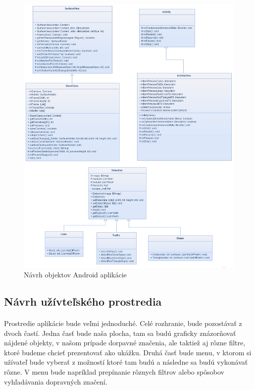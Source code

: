 \documentclass[12pt]{article}
\begin{document}
\begin{figure}[p]
\centering
\includegraphics[width=1\textwidth,natwidth=800,natheight=1000]{uml_objects.jpg}
\vspace{-10pt}
\caption{Návrh objektov Android aplikácie}
\vspace{-10pt}
\label{uml_objects_diagram}
\end{figure}
\subsection{Návrh užívteľského prostredia}
\paragraph{}
Prostredie aplikácie bude veľmi jednoduché. Celé rozhranie, bude pozostávať z dvoch častí. Jedna časť bude naša plocha, tam sa budú graficky znázorňovať nájdené objekty, v našom prípade dorpavné značenia, ale taktiež aj rôzne filtre, ktoré budeme chcieť prezentovať ako ukážku.
Druhá časť bude menu, v ktorom si užívateľ bude vyberať z možností ktoré tam budú a následne sa budú vykonávať rôzne. V menu bude napríklad prepínanie rôznych filtrov alebo spôsobov vyhľadávania dopravných značení.
\end{document}
